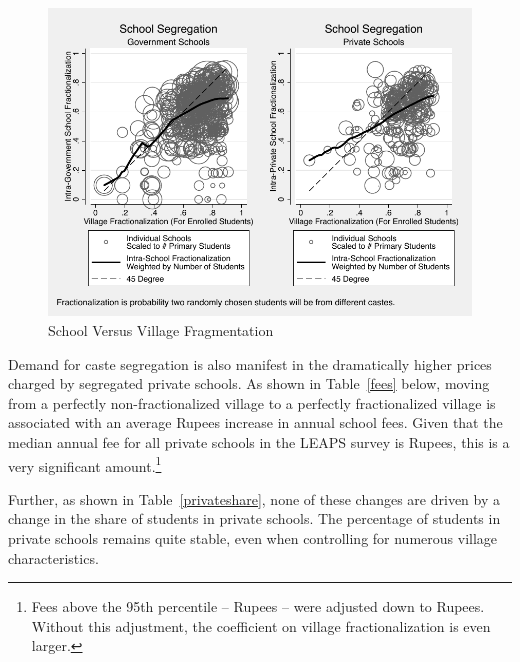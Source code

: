 \documentclass[Eubank_pk_ethnic_sorting.tex]{subfiles}
\begin{document}
\begin{figure}[H]
	\begin{center}
	\caption{School Versus Village Fragmentation}\label{schoolvvillageherf}
	\includegraphics[scale=1.0]{../results/intra_versus_intervillage_frac_combined.pdf}
	\end{center}
\end{figure}

Demand for caste segregation is also manifest in the dramatically higher prices charged by segregated private schools. As shown in Table~\ref{fees} below, moving from a perfectly non-fractionalized village to a perfectly fractionalized village is associated with an average  Rupees increase in annual school fees. Given that the median annual fee for all private schools in the LEAPS survey is  Rupees, this is a very significant amount.\footnote{Fees above the 95th percentile --  Rupees -- were adjusted down to   Rupees. Without this adjustment, the coefficient on village fractionalization is even larger.}



Further, as shown in Table~\ref{privateshare}, none of these changes are driven by a change in the share of students in private schools. The percentage of students in private schools remains quite stable, even when controlling for numerous village characteristics.


\end{document}

